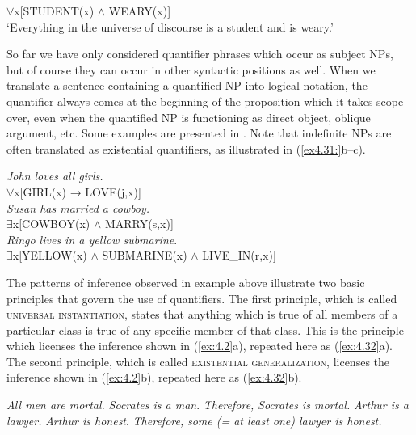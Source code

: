 \ea \label{ex:4.30}
${\forall}$x[STUDENT(x) $\wedge$ WEARY(x)]\\
‘Everything in the universe of discourse is a student and is weary.’
\z


So far we have only considered quantifier phrases which occur as subject NPs, but of course they can occur in other syntactic positions as well. When we translate a sentence containing a quantified NP into logical notation, the quantifier always comes at the beginning of the proposition which it takes scope over, even when the quantified NP is functioning as direct object, oblique argument, etc. Some examples are presented in . Note that indefinite NPs are often translated as existential quantifiers, as illustrated in (\ref{ex4.31:}b--c).


\ea \label{ex:4.31}
\ea \textit{John loves all girls.}\\
  ${\forall}$x[GIRL(x) → LOVE(j,x)]\\
\ex \textit{Susan has married a cowboy.}\\
  ${\exists}$x[COWBOY(x) $\wedge$ MARRY(s,x)]\\
\ex \textit{Ringo lives in a yellow submarine}.\\
  ${\exists}$x[YELLOW(x) $\wedge$ SUBMARINE(x) ${\wedge}$ LIVE\_IN(r,x)]
                       \z
\z


The patterns of inference observed in example  above illustrate two basic principles that govern the use of quantifiers. The first principle, which is called \textsc{universal instantiation}, states that anything which is true of all members of a particular class is true of any specific member of that class. This is the principle which licenses the inference shown in (\ref{ex:4.2}a), repeated here as (\ref{ex:4.32}a). The second principle, which is called \textsc{existential generalization}, licenses the inference shown in (\ref{ex:4.2}b), repeated here as (\ref{ex:4.32}b).

\settowidth\jamwidth{${\forall}$x[MAN(x) → MORTAL(x)}
\ea \label{ex:4.32}
\ea  \textit{All men are mortal.}  
\textit{Socrates is a man}.        
\FelixHRule
\textit{Therefore,} \textit{Socrates is mortal.}  
\ex   \textit{Arthur is a lawyer.}                
\textit{Arthur is honest}.                        
\FelixHRule
\textit{Therefore,} \textit{some (= at least one) lawyer is honest.}  \jambox{${\exists}$x[LAWYER(x) $\wedge$ HONEST(x)}
\z \z

